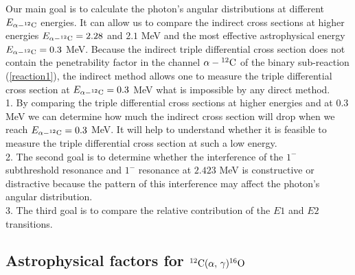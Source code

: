\documentclass[prl,unsortedaddress,groupedaddress,twocolumn,amsmath,amsfonts,amssymb,showpacs,floatfix,nofootinbib]{revtex4}
\begin{document}
Our main goal is to calculate the photon's angular distributions at different $E_{\alpha-{}^{12}{\rm C}}$
energies. It can allow us to compare the indirect cross sections at higher energies $E_{\alpha-{}^{12}{\rm C}} = 2.28$ and $2.1$ MeV and the most effective astrophysical energy $E_{\alpha-{}^{12}{\rm C}} = 0.3$ MeV. Because the indirect triple differential cross section does not contain the penetrability factor in the channel $\alpha-{}^{12}{\rm C}$ of the binary sub-reaction (\ref{reaction1}), the indirect method allows one to measure the triple differential cross section at $E_{\alpha-{}^{12}{\rm C}} = 0.3$ MeV what is impossible by any direct method.\\
1.  By comparing the triple differential cross sections at higher energies and at $0.3$ MeV we can determine how much the indirect cross section will drop when we reach $E_{\alpha-{}^{12}{\rm C}} = 0.3$ MeV. It will help to understand whether it is feasible to measure the triple differential cross section  at such a low energy.\\
2. The second goal is to determine whether the interference of the $1^{-}$ subthreshold resonance and $1^{-}$ resonance at $2.423$ MeV is constructive or distractive because the pattern of this interference may affect the photon's angular distribution.\\
3. The third goal is to compare the relative contribution of the $E1$ and $E2$ transitions. 



\subsection{Astrophysical factors for ${}^{12}{\rm C}(\alpha,\,\gamma){}^{16}{\rm O}$}
\end{document}
